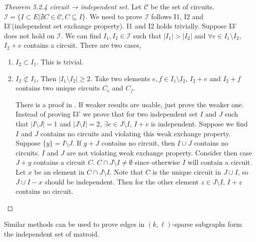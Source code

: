 \begin{proof}[Theorem 5.2.4 circuit → independent set]
    Let $\mathcal C$ be the set of circuits. $\mathcal{I}=\{I\subset E| \nexists C\in \mathcal C, C\subseteq I\}$. We need to prove $\mathcal{I}$ follows I1, I2 and I3'(independent set exchange property). I1 and I2 holds trivially. Suppose I3' does not hold on $\mathcal I$. We can find $I_1,I_2\in \mathcal{I}$ such that $|I_1| > |I_2|$ and $\forall e\in I_1\setminus I_2$, $I_2+e$ contains a circuit. There are two cases,
    \begin{enumerate}
        \item $I_2\subset I_1$. This is trivial.
        \item $I_2 \not \subset I_1$, Then $|I_1\setminus I_2|\geq 2$. Take two elements $e,f\in I_1\setminus I_2$, $I_2+e$ and $I_2+f$ contains two unique circuits $C_e$ and $C_f$. 
        
        There is a proof in \cite{schrijver_combinatorial_2003}. If weaker results are usable, just prove the weaker one. Instead of proving I3' we prove that for two independent set $I$ and $J$ such that $|I\setminus J|=1$ and $|J\setminus I| =2$, $\exists e\in J\setminus I$, $I+e$ is independent.
        Suppose we find $I$ and $J$ contains no circuits and violating this weak exchange property. Suppose $\{y\}=I\setminus J$. If $y+J$ contains no circuit, then $I\cup J$ contains no circuits. $I$ and $J$ are not violating weak exchange property. Consider then case $J+y$ contains a circuit $C$. $C\cap J\setminus I\not= \emptyset$ since otherwise $I$ will contain a circuit. Let $x$ be an element in $C\cap J\setminus I$. Note that $C$ is the unique circuit in $J\cup I$, so $J\cup I-x$ should be independent. Then for the other element $z\in J\setminus I$, $I+z$ contains no circuit.
    \end{enumerate}
            
\end{proof}
Similar methods can be used to prove edges in $(k,\ell)$-sparse subgraphs form the independent set of matroid.

